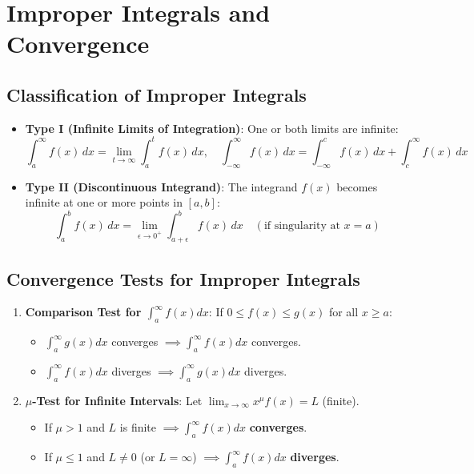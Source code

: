 \section{Improper Integrals and Convergence}

\subsection{Classification of Improper Integrals}
\begin{itemize}[leftmargin=1.5em]
    \item \textbf{Type I (Infinite Limits of Integration)}: One or both limits are infinite:
    \begin{equation}
        \int_a^\infty f(x)\,dx = \lim_{t\to\infty} \int_a^t f(x)\,dx, \quad \int_{-\infty}^\infty f(x)\,dx = \int_{-\infty}^c f(x)\,dx + \int_c^\infty f(x)\,dx
    \end{equation}
    \item \textbf{Type II (Discontinuous Integrand)}: The integrand $f(x)$ becomes infinite at one or more points in ${[a,b]}$:
    \begin{equation}
        \int_a^b f(x)\,dx = \lim_{\epsilon\to 0^+} \int_{a+\epsilon}^b f(x)\,dx \quad (\text{if singularity at } x = a)
    \end{equation}
\end{itemize}

\subsection{Convergence Tests for Improper Integrals}
\begin{enumerate}[leftmargin=1.5em]
    \item \textbf{Comparison Test for $\int_a^\infty f(x)dx$}: If $0 \le f(x) \le g(x)$ for all $x \ge a$:
    \begin{itemize}
        \item $\int_a^\infty g(x)dx$ converges $\implies \int_a^\infty f(x)dx$ converges.
        \item $\int_a^\infty f(x)dx$ diverges $\implies \int_a^\infty g(x)dx$ diverges.
    \end{itemize}
    \item \textbf{$\mu$-Test for Infinite Intervals}: Let $\lim_{x\to\infty} x^\mu f(x) = L$ (finite).
    \begin{itemize}
        \item If $\mu > 1$ and $L$ is finite $\implies \int_a^\infty f(x)dx$ \textbf{converges}.
        \item If $\mu \le 1$ and $L \ne 0$ (or $L = \infty$) $\implies \int_a^\infty f(x)dx$ \textbf{diverges}.
    \end{itemize}
\end{enumerate}

